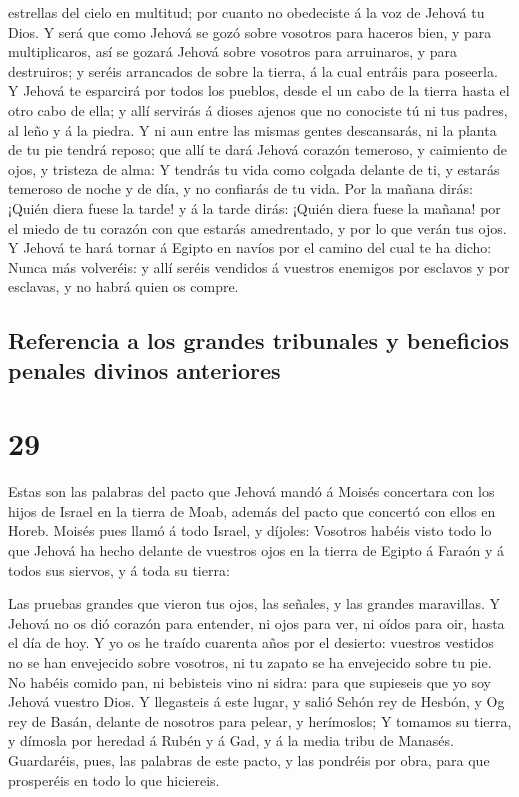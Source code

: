 estrellas del cielo en multitud; por cuanto no obedeciste á la voz de
Jehová tu Dios.  Y será que como Jehová se gozó sobre
vosotros para haceros bien, y para multiplicaros, así se gozará Jehová
sobre vosotros para arruinaros, y para destruiros; y seréis arrancados
de sobre la tierra, á la cual entráis para poseerla.  Y
Jehová te esparcirá por todos los pueblos, desde el un cabo de la tierra
hasta el otro cabo de ella; y allí servirás á dioses ajenos que no
conociste tú ni tus padres, al leño y á la piedra.  Y ni
aun entre las mismas gentes descansarás, ni la planta de tu pie tendrá
reposo; que allí te dará Jehová corazón temeroso, y caimiento de ojos, y
tristeza de alma:  Y tendrás tu vida como colgada delante
de ti, y estarás temeroso de noche y de día, y no confiarás de tu vida.
 Por la mañana dirás: ¡Quién diera fuese la tarde! y á la
tarde dirás: ¡Quién diera fuese la mañana! por el miedo de tu corazón
con que estarás amedrentado, y por lo que verán tus ojos. 
Y Jehová te hará tornar á Egipto en navíos por el camino del cual te ha
dicho: Nunca más volveréis: y allí seréis vendidos á vuestros enemigos
por esclavos y por esclavas, y no habrá quien os compre.

\hypertarget{referencia-a-los-grandes-tribunales-y-beneficios-penales-divinos-anteriores}{%
\subsection{Referencia a los grandes tribunales y beneficios penales
divinos
anteriores}\label{referencia-a-los-grandes-tribunales-y-beneficios-penales-divinos-anteriores}}

\hypertarget{section-28}{%
\section{29}\label{section-28}}

 Estas son las palabras del pacto que Jehová mandó á Moisés
concertara con los hijos de Israel en la tierra de Moab, además del
pacto que concertó con ellos en Horeb.  Moisés pues llamó á
todo Israel, y díjoles: Vosotros habéis visto todo lo que Jehová ha
hecho delante de vuestros ojos en la tierra de Egipto á Faraón y á todos
sus siervos, y á toda su tierra:

 Las pruebas grandes que vieron tus ojos, las señales, y las
grandes maravillas.  Y Jehová no os dió corazón para
entender, ni ojos para ver, ni oídos para oir, hasta el día de hoy.
 Y yo os he traído cuarenta años por el desierto: vuestros
vestidos no se han envejecido sobre vosotros, ni tu zapato se ha
envejecido sobre tu pie.  No habéis comido pan, ni bebisteis
vino ni sidra: para que supieseis que yo soy Jehová vuestro Dios.
 Y llegasteis á este lugar, y salió Sehón rey de Hesbón, y
Og rey de Basán, delante de nosotros para pelear, y herímoslos;
 Y tomamos su tierra, y dímosla por heredad á Rubén y á Gad,
y á la media tribu de Manasés.  Guardaréis, pues, las
palabras de este pacto, y las pondréis por obra, para que prosperéis en
todo lo que hiciereis.

